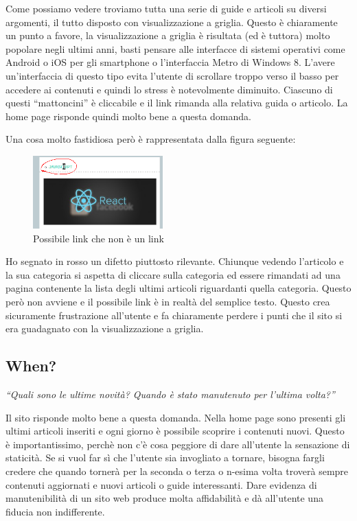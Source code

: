 Come possiamo vedere troviamo tutta una serie di guide e articoli su diversi argomenti, il tutto disposto con visualizzazione a griglia. Questo è chiaramente un punto a favore, la visualizzazione a griglia è risultata (ed è tuttora) molto popolare negli ultimi anni, basti pensare alle interfacce di sistemi operativi come Android o iOS per gli smartphone o l'interfaccia Metro di Windows 8. L'avere un'interfaccia di questo tipo evita l'utente di scrollare troppo verso il basso per accedere ai contenuti e quindi lo stress è notevolmente diminuito. Ciascuno di questi ``mattoncini'' è cliccabile e il link rimanda alla relativa guida o articolo. La home page risponde quindi molto bene a questa domanda.

Una cosa molto fastidiosa però è rappresentata dalla figura seguente:

\begin{figure}[H]
\centering
\includegraphics[width=50mm]{images/detail1.png}
\caption{Possibile link che non è un link}
\end{figure}

Ho segnato in rosso un difetto piuttosto rilevante. Chiunque vedendo l'articolo e la sua categoria si aspetta di cliccare sulla categoria ed essere rimandati ad una pagina contenente la lista degli ultimi articoli riguardanti quella categoria. Questo però non avviene e il possibile link è in realtà del semplice testo. Questo crea sicuramente frustrazione all'utente e fa chiaramente perdere i punti che il sito si era guadagnato con la visualizzazione a griglia.

\subsection{When?}

\begin{center}

\textit{``Quali sono le ultime novità? Quando è stato manutenuto per l'ultima volta?''}

\end{center}

Il sito risponde molto bene a questa domanda. Nella home page sono presenti gli ultimi articoli inseriti e ogni giorno è possibile scoprire i contenuti nuovi. Questo è importantissimo, perchè non c'è cosa peggiore di dare all'utente la sensazione di staticità. Se si vuol far sì che l'utente sia invogliato a tornare, bisogna fargli credere che quando tornerà per la seconda o terza o n-esima volta troverà sempre contenuti aggiornati e nuovi articoli o guide interessanti. Dare evidenza di manutenibilità di un sito web produce molta affidabilità e dà all'utente una fiducia non indifferente.



